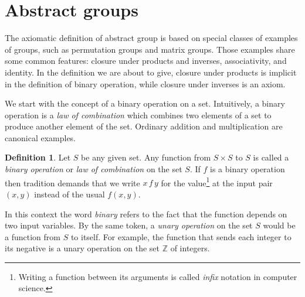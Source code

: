 \documentclass[11pt]{article}
\theoremstyle{definition}
\newtheorem{defn}[thm]{Definition}
\newcommand{\Z}{\mathbb{Z}} %
\begin{document}
\setcounter{section}{16}

\section{Abstract groups}\noindent
The axiomatic definition of abstract group is
based on special classes of examples of groups, such as permutation
groups and matrix groups.  Those examples share some common features:
closure under products and inverses, associativity, and identity. In
the definition we are about to give, closure under products is
implicit in the definition of binary operation, while closure under
inverses is an axiom.

We start with the concept of a binary
operation on a set. Intuitively, a binary
operation is a \emph{law of combination} which combines two elements
of a set to produce another element of the set. Ordinary addition and
multiplication are canonical examples.

\begin{defn}
Let $S$ be any given set. Any function from $S \times S$ to $S$ is
called a {\em binary operation} or \emph{law of combination} on the
set $S$. If $f$ is a binary operation then tradition demands that we
write $x\,f\,y$ for the value\footnote{Writing a function between its
  arguments is called {\em infix} notation in computer science.} at
the input pair $(x,y)$ instead of the usual $f(x,y)$.
\end{defn}

In this context the word \emph{binary} refers to the fact that the
function depends on two input variables. By the same token, a
\emph{unary operation} on the set $S$ would be a function from $S$ to
itself. For example, the function that sends each integer to its
negative is a unary operation on the set $\Z$ of integers.
\end{document}
